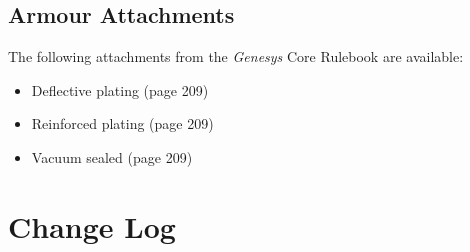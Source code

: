 \documentclass[9pt, openany]{extbook}
\begin{document}
\section{Armour Attachments}
The following attachments from the \emph{Genesys} Core Rulebook are available:

\begin{itemize}[noitemsep]
\item Deflective plating (page 209)
\item Reinforced plating (page 209)
\item Vacuum sealed (page 209)
\end{itemize}



\appendix

\chapter{Change Log}
\label{changelog}
\end{document}
